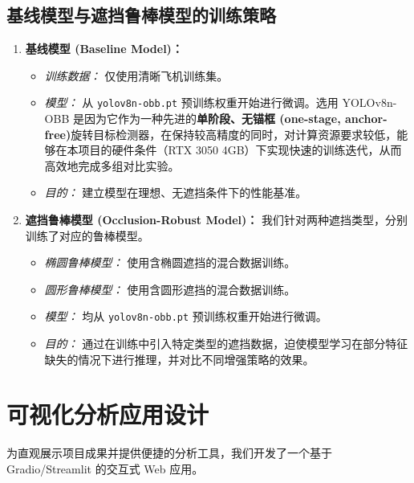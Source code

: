 \documentclass[12pt, a4paper]{report}
\begin{document}
\subsection{基线模型与遮挡鲁棒模型的训练策略}
\begin{enumerate}
    \item \textbf{基线模型 (Baseline Model)：}
    \begin{itemize}
        \item \textit{训练数据：} 仅使用清晰飞机训练集。
        \item \textit{模型：} 从 \texttt{yolov8n-obb.pt} 预训练权重开始进行微调。选用 YOLOv8n-OBB 是因为它作为一种先进的\textbf{单阶段、无锚框 (one-stage, anchor-free)}旋转目标检测器，在保持较高精度的同时，对计算资源要求较低，能够在本项目的硬件条件（RTX 3050 4GB）下实现快速的训练迭代，从而高效地完成多组对比实验。
        \item \textit{目的：} 建立模型在理想、无遮挡条件下的性能基准。
    \end{itemize}
    \item \textbf{遮挡鲁棒模型 (Occlusion-Robust Model)：} 我们针对两种遮挡类型，分别训练了对应的鲁棒模型。
    \begin{itemize}
        \item \textit{椭圆鲁棒模型：} 使用含椭圆遮挡的混合数据训练。
        \item \textit{圆形鲁棒模型：} 使用含圆形遮挡的混合数据训练。
        \item \textit{模型：} 均从 \texttt{yolov8n-obb.pt} 预训练权重开始进行微调。
        \item \textit{目的：} 通过在训练中引入特定类型的遮挡数据，迫使模型学习在部分特征缺失的情况下进行推理，并对比不同增强策略的效果。
    \end{itemize}
\end{enumerate}

\section{可视化分析应用设计}
为直观展示项目成果并提供便捷的分析工具，我们开发了一个基于 Gradio/Streamlit 的交互式 Web 应用。
\end{document}
